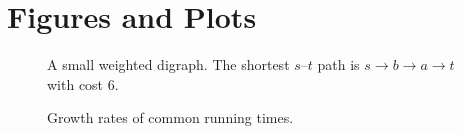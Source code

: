 \section{Figures and Plots}

\begin{figure}[h]
\centering

\caption{A small weighted digraph. The shortest $s$--$t$ path is $s\to b\to a\to t$ with cost $6$.}
\label{fig:graph}
\end{figure}

\begin{figure}[h]
\centering

\caption{Growth rates of common running times.}
\label{fig:growth}
\end{figure}

